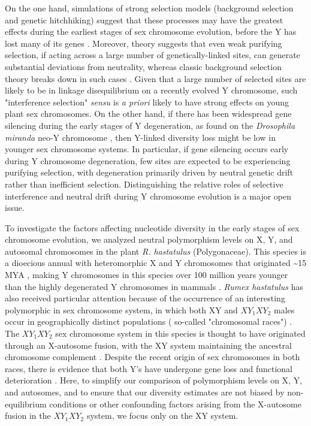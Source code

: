 \documentclass[9pt,twocolumn,twoside]{gsajnl}
\begin{document}
On the one hand, simulations of strong selection models (background selection and genetic hitchhiking) suggest that these processes may have the greatest effects during the earliest stages of sex chromosome evolution, before the Y has lost many of its genes \citep{bachtrog2008temporal}. Moreover, theory suggests that even weak purifying selection, if acting across a large number of genetically-linked sites, can generate substantial deviations from neutrality, whereas classic background selection theory breaks down in such cases \citep{mcvean2000, comeron2002population, KaiserCharlesworth, good2014genetic}. Given that a large number of selected sites are likely to be in linkage disequilibrium on a recently evolved Y chromosome, such "interference selection" \textit{sensu} \citep{good2014genetic} is \textit{a priori} likely to have strong effects on young plant sex chromosomes. On the other hand, if there has been widespread gene silencing during the early stages of Y degeneration, as found on the \textit{Drosophila miranda} neo-Y chromosome \citep{zhou2012chromosome}, then Y-linked diversity loss might be low in younger sex chromosome systems. In particular, if gene silencing occurs early during Y chromosome degeneration, few sites are expected to be experiencing purifying selection, with degeneration primarily driven by neutral genetic drift rather than inefficient selection. Distinguishing the relative roles of selective interference and neutral drift during Y chromosome evolution is a major open issue.

To investigate the factors affecting nucleotide diversity in the early stages of sex chromosome evolution, we analyzed neutral polymorphism levels on X, Y, and autosomal chromosomes in the plant \textit{R. hastatulus }(Polygonaceae). This species is a dioecious annual with heteromorphic X and Y chromosomes that originated \textasciitilde 15 MYA \citep{quesada2011,grabowska2015,navajas2005}, making Y chromosomes in this species over 100 million years younger than the highly degenerated Y chromosomes in mammals \citep{lahn1999,ross2005dna}. \textit{Rumex hastatulus} has also received particular attention because of the occurrence of an interesting polymorphic in sex chromosome system, in which both XY and $XY_{1}XY_{2}$ males occur in geographically distinct populations ( so-called "chromosomal races") \citep{smith1963mechanism}. The $XY_{1}XY_{2}$ sex chromosome system in this species is thought to have originated through an X-autosome fusion, with the XY system maintaining the ancestral chromosome complement \citep{smith1964evolving}. Despite the recent origin of sex chromosomes in both races, there is evidence that both Y's have undergone gene loss and functional deterioration \citep{hough2014}. Here, to simplify our comparison of polymorphism levels on X, Y, and autosomes, and to ensure that our diversity estimates are not biased by non-equilibrium conditions or other confounding factors arising from the X-autosome fusion in the $XY_{1}XY_{2}$ system, we focus only on the XY system.
\end{document}
